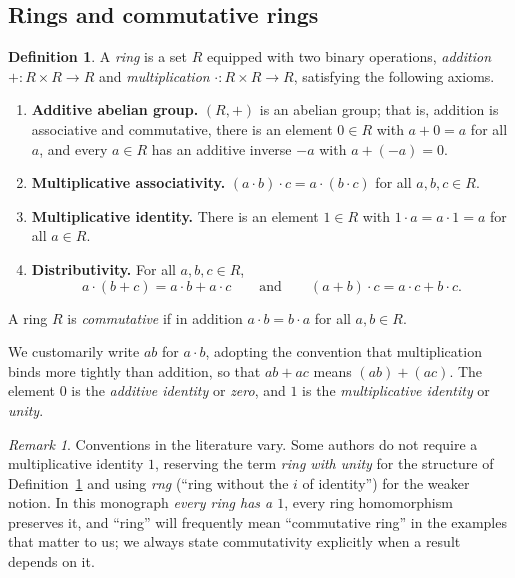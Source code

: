 \documentclass[11pt,a4paper]{article}
\theoremstyle{definition}
\newtheorem{definition}[theorem]{Definition}
\theoremstyle{remark}
\newtheorem{remark}[theorem]{Remark}
\begin{document}
\subsection{Rings and commutative rings}

\begin{definition}\label{ringsfields:def-ring}
A \emph{ring} is a set \(R\) equipped with two binary operations, \emph{addition} \(+\colon R\times R\to R\) and \emph{multiplication} \(\cdot\colon R\times R\to R\), satisfying the following axioms.
\begin{enumerate}
\item \textbf{Additive abelian group.} \((R,+)\) is an abelian group; that is, addition is associative and commutative, there is an element \(0\in R\) with \(a+0=a\) for all \(a\), and every \(a\in R\) has an additive inverse \(-a\) with \(a+(-a)=0\).
\item \textbf{Multiplicative associativity.} \((a\cdot b)\cdot c = a\cdot(b\cdot c)\) for all \(a,b,c\in R\).
\item \textbf{Multiplicative identity.} There is an element \(1\in R\) with \(1\cdot a = a\cdot 1 = a\) for all \(a\in R\).
\item \textbf{Distributivity.} For all \(a,b,c\in R\),
\[
a\cdot(b+c) = a\cdot b + a\cdot c
\qquad\text{and}\qquad
(a+b)\cdot c = a\cdot c + b\cdot c.
\]
\end{enumerate}
A ring \(R\) is \emph{commutative} if in addition \(a\cdot b = b\cdot a\) for all \(a,b\in R\).
\end{definition}

We customarily write \(ab\) for \(a\cdot b\), adopting the convention that multiplication binds more tightly than addition, so that \(ab+ac\) means \((ab)+(ac)\). The element \(0\) is the \emph{additive identity} or \emph{zero}, and \(1\) is the \emph{multiplicative identity} or \emph{unity}.

\begin{remark}\label{ringsfields:rem-conventions}
Conventions in the literature vary. Some authors do not require a multiplicative identity \(1\), reserving the term \emph{ring with unity} for the structure of Definition~\ref{ringsfields:def-ring} and using \emph{rng} (``ring without the \(i\) of identity'') for the weaker notion. In this monograph \emph{every ring has a \(1\)}, every ring homomorphism preserves it, and ``ring'' will frequently mean ``commutative ring'' in the examples that matter to us; we always state commutativity explicitly when a result depends on it.
\end{remark}
\end{document}
